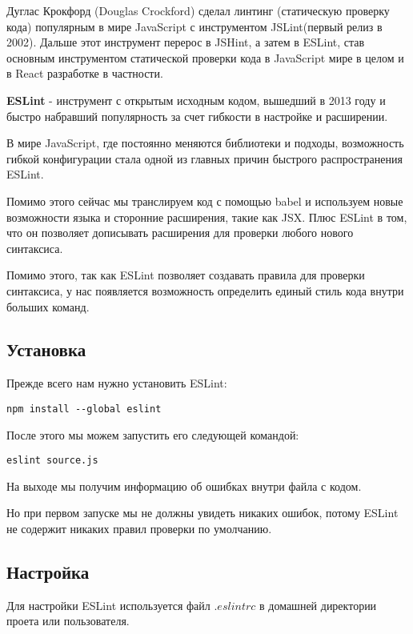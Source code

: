 Дуглас Крокфорд (Douglas Crockford) сделал линтинг (статическую проверку кода) популярным в мире JavaScript с инструментом JSLint(первый релиз в 2002). Дальше этот инструмент перерос в JSHint, а затем в ESLint, став основным инструментом статической проверки кода в JavaScript мире в целом и в React разработке в частности.

\textbf{ESLint} - инструмент с открытым исходным кодом, вышедший в 2013 году и быстро набравший популярность за счет гибкости в настройке и расширении.

В мире JavaScript, где постоянно меняются библиотеки и подходы, возможность гибкой конфигурации стала одной из главных причин быстрого распространения ESLint. 

Помимо этого сейчас мы транслируем код с помощью babel и используем новые возможности языка и сторонние расширения, такие как JSX. Плюс ESLint в том, что он позволяет дописывать расширения для проверки любого нового синтаксиса.

Помимо этого, так как ESLint позволяет создавать правила для проверки синтаксиса, у нас появляется возможность определить единый стиль кода внутри больших команд.


\subsection*{Установка}

Прежде всего нам нужно установить ESLint:

\begin{lstlisting}
npm install --global eslint
\end{lstlisting}

После этого мы можем запустить его следующей командой:

\begin{lstlisting}
eslint source.js
\end{lstlisting}

На выходе мы получим информацию об ошибках внутри файла с кодом.

Но при первом запуске мы не должны увидеть никаких ошибок, потому ESLint не содержит никаких правил проверки по умолчанию.

\subsection*{Настройка}

Для настройки ESLint используется файл $.eslintrc$ в домашней директории проета или пользователя.

